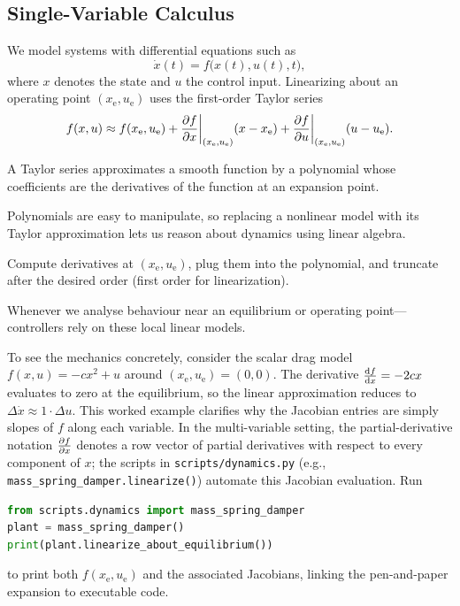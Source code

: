 \subsection{Single-Variable Calculus}
We model systems with differential equations such as
\begin{equation}
    \dot{x}(t) = f\big(x(t), u(t), t\big),
\end{equation}
where $x$ denotes the state and $u$ the control input. Linearizing about an operating point $(x_\text{e}, u_\text{e})$ uses the first-order Taylor series
\begin{equation}
    f(x, u) \approx f(x_\text{e}, u_\text{e}) + \pdv{f}{x}\bigg\vert_{(x_\text{e}, u_\text{e})} (x - x_\text{e}) + \pdv{f}{u}\bigg\vert_{(x_\text{e}, u_\text{e})} (u - u_\text{e}).
\end{equation}
\begin{description}[leftmargin=2.5em, style=nextline]
    \item[\textbf{What?}] A Taylor series approximates a smooth function by a polynomial whose coefficients are the derivatives of the function at an expansion point.
    \item[\textbf{Why?}] Polynomials are easy to manipulate, so replacing a nonlinear model with its Taylor approximation lets us reason about dynamics using linear algebra.
    \item[\textbf{How?}] Compute derivatives at $(x_\text{e}, u_\text{e})$, plug them into the polynomial, and truncate after the desired order (first order for linearization).
    \item[\textbf{When?}] Whenever we analyse behaviour near an equilibrium or operating point—controllers rely on these local linear models.
\end{description}
To see the mechanics concretely, consider the scalar drag model $f(x,u) = -c x^2 + u$ around $(x_\text{e}, u_\text{e}) = (0, 0)$. The derivative $\dv{f}{x} = -2 c x$ evaluates to zero at the equilibrium, so the linear approximation reduces to $\Delta \dot{x} \approx 1 \cdot \Delta u$. This worked example clarifies why the Jacobian entries are simply slopes of $f$ along each variable.
In the multi-variable setting, the partial-derivative notation $\pdv{f}{x}$ denotes a row vector of partial derivatives with respect to every component of $x$; the scripts in \texttt{scripts/dynamics.py} (e.g., \texttt{mass\_spring\_damper.linearize()}) automate this Jacobian evaluation. Run
\begin{lstlisting}[language=python]
from scripts.dynamics import mass_spring_damper
plant = mass_spring_damper()
print(plant.linearize_about_equilibrium())
\end{lstlisting}
to print both $f(x_\text{e}, u_\text{e})$ and the associated Jacobians, linking the pen-and-paper expansion to executable code.

